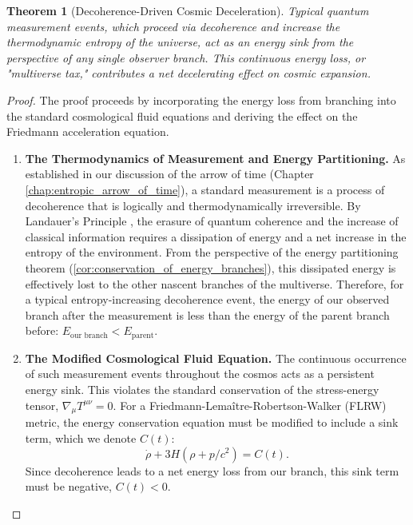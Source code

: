 \documentclass[11pt, letterpaper]{report}
\theoremstyle{plain} %
\newtheorem{theorem}{Theorem}[chapter]
\theoremstyle{definition} %
\theoremstyle{remark} %
\begin{document}
\begin{theorem}[Decoherence-Driven Cosmic Deceleration]
\label{thm:multiverse_tax}
Typical quantum measurement events, which proceed via decoherence and increase the thermodynamic entropy of the universe, act as an energy sink from the perspective of any single observer branch. This continuous energy loss, or "multiverse tax," contributes a net decelerating effect on cosmic expansion.
\end{theorem}
\begin{proof}
The proof proceeds by incorporating the energy loss from branching into the standard cosmological fluid equations and deriving the effect on the Friedmann acceleration equation.

\begin{enumerate}
    \item \textbf{The Thermodynamics of Measurement and Energy Partitioning.}
    As established in our discussion of the arrow of time (Chapter \ref{chap:entropic_arrow_of_time}), a standard measurement is a process of decoherence that is logically and thermodynamically irreversible. By Landauer's Principle \cite{Landauer1961, Bennett1982}, the erasure of quantum coherence and the increase of classical information requires a dissipation of energy and a net increase in the entropy of the environment. From the perspective of the energy partitioning theorem (\cref{cor:conservation_of_energy_branches}), this dissipated energy is effectively lost to the other nascent branches of the multiverse. Therefore, for a typical entropy-increasing decoherence event, the energy of our observed branch after the measurement is less than the energy of the parent branch before: $E_{\text{our branch}} < E_{\text{parent}}$.

    \item \textbf{The Modified Cosmological Fluid Equation.}
    The continuous occurrence of such measurement events throughout the cosmos acts as a persistent energy sink. This violates the standard conservation of the stress-energy tensor, $\nabla_\mu T^{\mu\nu}=0$. For a Friedmann-Lemaître-Robertson-Walker (FLRW) metric, the energy conservation equation must be modified to include a sink term, which we denote $C(t)$:
    \begin{equation}
        \dot{\rho} + 3H(\rho + p/c^2) = C(t).
    \end{equation}
    Since decoherence leads to a net energy loss from our branch, this sink term must be negative, $C(t) < 0$.


\end{enumerate}
\end{proof}
\end{document}
